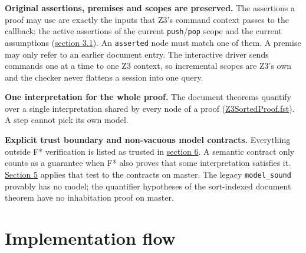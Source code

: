 \documentclass[10pt,a4paper]{article}
\begin{document}
\textbf{Original assertions, premises and scopes are preserved.} The assertions a proof may use are exactly the inputs that Z3's command context passes to the callback: the active assertions of the current \texttt{push}/\texttt{pop} scope and the current assumptions (\hyperref[sec:31-input-solver-and-callback]{section 3.1}). An \texttt{asserted} node must match one of them. A premise may only refer to an earlier document entry. The interactive driver sends commands one at a time to one Z3 context, so incremental scopes are Z3's own and the checker never flattens a session into one query.

\textbf{One interpretation for the whole proof.} The document theorems quantify over a single interpretation shared by every node of a proof (\href{https://github.com/Z3Prover/z3/blob/8fbb275aba0472e862e289c7af1331b3bd5d512c/fstar/Z3SortedProof.fst\#L1162-L1178}{Z3Sorted\allowbreak{}Proof.\allowbreak{}fst}). A step cannot pick its own model.

\textbf{Explicit trust boundary and non-vacuous model contracts.} Everything outside F* verification is listed as trusted in \hyperref[sec:6-extraction-runtime-and-build]{section 6}. A semantic contract only counts as a guarantee when F* also proves that some interpretation satisfies it. \hyperref[sec:5-formal-assurance]{Section 5} applies that test to the contracts on master. The legacy \texttt{model\_\allowbreak{}sound} provably has no model; the quantifier hypotheses of the sort-indexed document theorem have no inhabitation proof on master.

\section{Implementation flow}\label{sec:3-implementation-flow}
\end{document}
